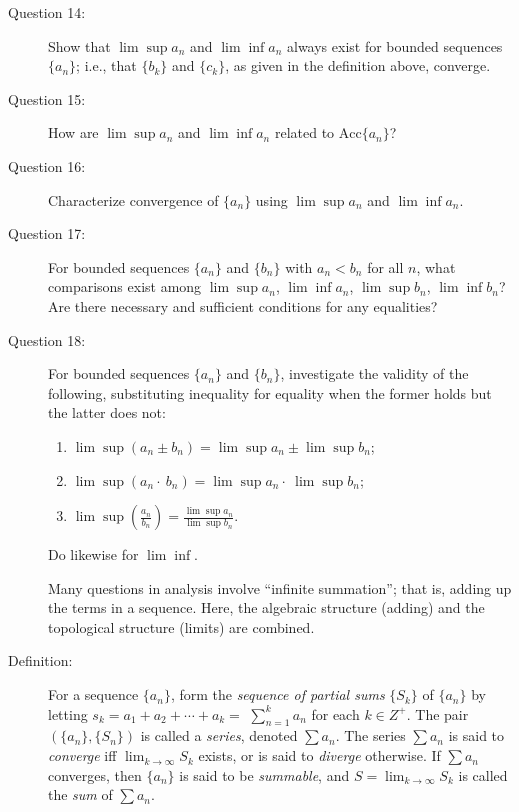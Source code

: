 \documentclass{article}
\begin{document}
\begin{description}
  \item[Question 14:] Show that $\lim \sup a_n$ and $\lim \inf a_n$ always exist for bounded sequences $\{ a_n \}$; i.e., that $\{b_k\}$ and $\{c_k\}$, as given in the definition above, converge.

  \item[Question 15:] How are $\lim \sup a_n$ and $\lim \inf a_n$ related to $\text{Acc} \{ a_n \}$?

  \item[Question 16:] Characterize convergence of $\{ a_n \}$ using $\lim \sup a_n$ and $\lim \inf a_n$.

  \item[Question 17:] For bounded sequences $\{ a_n \}$ and $\{ b_n \}$ with $a_n < b_n$ for all $n$, what comparisons exist among $\lim \sup a_n$, $\lim \inf a_n$, $\lim \sup b_n$, $\lim \inf b_n$? Are there necessary and sufficient conditions for any equalities?

  \item[Question 18:] For bounded sequences $\{ a_n \}$ and $\{ b_n \}$, investigate the validity of the following, substituting inequality for equality when the former holds but the latter does not:
    \begin{enumerate}[\hspace{1cm}(1)]
      \item $\lim \sup (a_n \pm b_n) = \lim \sup a_n \pm \lim \sup b_n$;
      \item $\lim \sup (a_n \cdot\ b_n) = \lim \sup a_n \cdot\ \lim \sup b_n$;
      \item $\lim \sup \left( \frac{a_n}{b_n} \right) = \frac{\lim \sup a_n}{\lim \sup b_n}$.
    \end{enumerate}
    Do likewise for $\lim \inf$.

  \item[] Many questions in analysis involve ``infinite summation''; that is, adding up the terms in a sequence. Here, the algebraic structure (adding) and the topological structure (limits) are combined.

  \item[Definition:] For a sequence $\{ a_n \}$, form the \emph{sequence of partial sums} $\{ S_k \}$ of $\{ a_n \}$ by letting $s_k = a_1 + a_2 + \cdots + a_k =$ $\displaystyle \sum_{n=1}^k a_n$ for each $k \in Z^+$. The pair $( \{ a_n \} , \{ S_n \} )$ is called a \emph{series}, denoted $\sum a_n$. The series $\sum a_n$ is said to \emph{converge} iff $\displaystyle \lim_{k \to \infty} S_k$ exists, or is said to \emph{diverge} otherwise. If $\sum a_n$ converges, then $\{ a_n \}$ is said to be \emph{summable}, and $\displaystyle S = \lim_{k \to \infty} S_k$ is called the \emph{sum} of $\sum a_n$.


\end{description}
\end{document}
